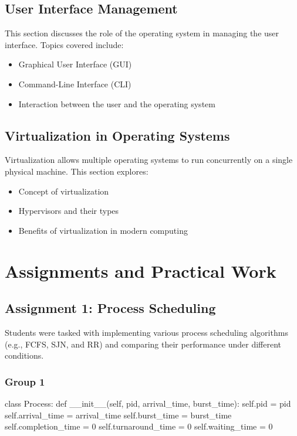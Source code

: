 \documentclass[12pt]{article}
\begin{document}
\subsection{User Interface Management}
This section discusses the role of the operating system in managing the user interface. Topics covered include:
\begin{itemize}
    \item Graphical User Interface (GUI)
    \item Command-Line Interface (CLI)
    \item Interaction between the user and the operating system
\end{itemize}

\subsection{Virtualization in Operating Systems}
Virtualization allows multiple operating systems to run concurrently on a single physical machine. This section explores:
\begin{itemize}
    \item Concept of virtualization
    \item Hypervisors and their types
    \item Benefits of virtualization in modern computing
\end{itemize}

\section{Assignments and Practical Work}
\subsection{Assignment 1: Process Scheduling}
Students were tasked with implementing various process scheduling algorithms (e.g., FCFS, SJN, and RR) and comparing their performance under different conditions.
    \subsubsection{Group 1}
        \begin{python}
            class Process:
            def __init__(self, pid, arrival_time, burst_time):
                self.pid = pid
                self.arrival_time = arrival_time
                self.burst_time = burst_time
                self.completion_time = 0
                self.turnaround_time = 0
                self.waiting_time = 0
        \end{python}
\end{document}
